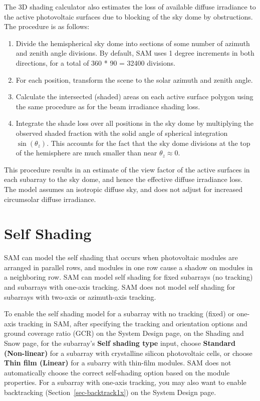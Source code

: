 \documentclass[12pt,letterpaper]{article}
\begin{document}
The 3D shading calculator also estimates the loss of available diffuse irradiance to the active photovoltaic surfaces due to blocking of the sky dome by obstructions.  The procedure is as follows:
\begin{enumerate}
\item Divide the hemispherical sky dome into sections of some number of azimuth and zenith angle divisions.  By default, SAM uses 1 degree increments in both directions, for a total of 360 * 90 = 32400 divisions.
\item For each position, transform the scene to the solar azimuth and zenith angle.
\item Calculate the intersected (shaded) areas on each active surface polygon using the same procedure as for the beam irradiance shading loss.
\item Integrate the shade loss over all positions in the sky dome by multiplying the observed shaded fraction with the solid angle of spherical integration $\sin(\theta_z)$.  This accounts for the fact that the sky dome divisions at the top of the hemisphere are much smaller than near $\theta_z\approx 0$.
\end{enumerate}

This procedure results in an estimate of the view factor of the active surfaces in each subarray to the sky dome, and hence the effective diffuse irradiance loss.  The model assumes an isotropic diffuse sky, and does not adjust for increased circumsolar diffuse irradiance.

\section{Self Shading}\label{sec-selfshad}

SAM can model the self shading that occurs when photovoltaic modules are arranged in parallel rows, and modules in one row cause a shadow on modules in a neighboring row. SAM can model self shading for fixed subarrays (no tracking) and subarrays with one-axis tracking. SAM does not model self shading for subarrays with two-axis or azimuth-axis tracking.

To enable the self shading model for a subarray with no tracking (fixed) or one-axis tracking in SAM, after specifying the tracking and orientation options and ground coverage ratio (GCR) on the System Design page, on the Shading and Snow page, for the subarray's \textbf{Self shading type} input, choose \textbf{Standard (Non-linear)} for a subarray with crystalline silicon photovoltaic cells, or choose \textbf{Thin film (Linear)} for a subarry with thin-film modules. SAM does not automatically choose the correct self-shading option based on the module properties. For a subarray with one-axis tracking, you may also want to enable backtracking  (Section~\ref{sec-backtrack1x}) on the System Design page.
\end{document}
